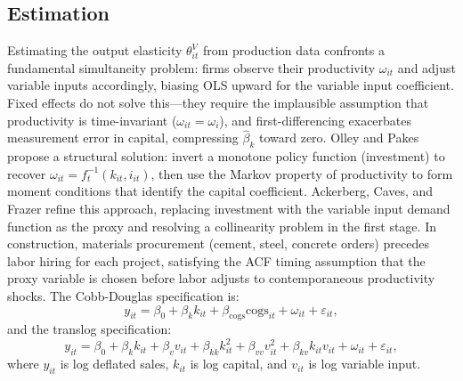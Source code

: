 \documentclass[11pt]{article}
\begin{document}
\subsection{Estimation}\label{sec:estimation}

Estimating the output elasticity $\theta^V_{it}$ from production data confronts a fundamental simultaneity problem: firms observe their productivity $\omega_{it}$ and adjust variable inputs accordingly, biasing OLS upward for the variable input coefficient. Fixed effects do not solve this---they require the implausible assumption that productivity is time-invariant ($\omega_{it} = \omega_i$), and first-differencing exacerbates measurement error in capital, compressing $\hat{\beta}_k$ toward zero. Olley and Pakes \cite{OlleyPakes1996} propose a structural solution: invert a monotone policy function (investment) to recover $\omega_{it} = f_t^{-1}(k_{it}, i_{it})$, then use the Markov property of productivity to form moment conditions that identify the capital coefficient. Ackerberg, Caves, and Frazer \cite{ACF2015} refine this approach, replacing investment with the variable input demand function as the proxy and resolving a collinearity problem in the first stage. In construction, materials procurement (cement, steel, concrete orders) precedes labor hiring for each project, satisfying the ACF timing assumption that the proxy variable is chosen before labor adjusts to contemporaneous productivity shocks. The Cobb-Douglas specification is:
\begin{equation}\label{eq:cd}
    y_{it} = \beta_0 + \beta_k k_{it} + \beta_{\text{cogs}} \text{cogs}_{it} + \omega_{it} + \varepsilon_{it},
\end{equation}
and the translog specification:
\begin{equation}\label{eq:tl}
    y_{it} = \beta_0 + \beta_k k_{it} + \beta_v v_{it} + \beta_{kk} k_{it}^2 + \beta_{vv} v_{it}^2 + \beta_{kv} k_{it} v_{it} + \omega_{it} + \varepsilon_{it},
\end{equation}
where $y_{it}$ is log deflated sales, $k_{it}$ is log capital, and $v_{it}$ is log variable input.
\end{document}
